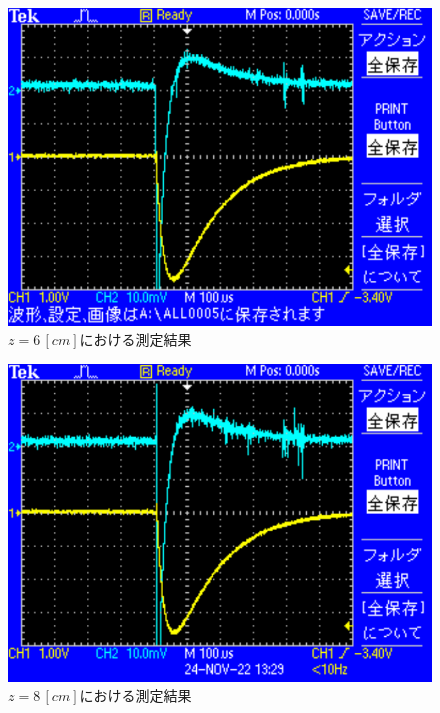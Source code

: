\begin{figure}[H]
    \centering
    \includegraphics[scale=0.5]{images-4.pdf}
    \caption{$z=6\,[cm]$における測定結果}
\end{figure}

\begin{figure}[H]
    \centering
    \includegraphics[scale=0.5]{images-5.pdf}
    \caption{$z=8\,[cm]$における測定結果}
\end{figure}

